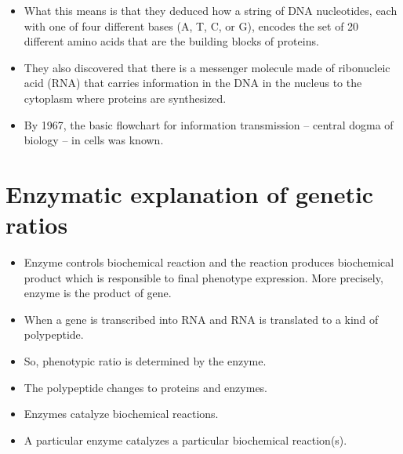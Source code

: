 \documentclass[11pt,dvipsnames,ignorenonframetext,aspectratio=169]{beamer}
\providecommand{\tightlist}{%
  \setlength{\itemsep}{0pt}\setlength{\parskip}{0pt}}
\begin{document}
\begin{frame}{}
\protect\hypertarget{section-11}{}

\begin{itemize}
\tightlist
\item
  What this means is that they deduced how a string of DNA nucleotides,
  each with one of four different bases (A, T, C, or G), encodes the set
  of 20 different amino acids that are the building blocks of proteins.
\item
  They also discovered that there is a messenger molecule made of
  ribonucleic acid (RNA) that carries information in the DNA in the
  nucleus to the cytoplasm where proteins are synthesized.
\item
  By 1967, the basic flowchart for information transmission -- central
  dogma of biology -- in cells was known.
\end{itemize}

\end{frame}

\hypertarget{enzymatic-explanation-of-genetic-ratios}{%
\section{Enzymatic explanation of genetic
ratios}\label{enzymatic-explanation-of-genetic-ratios}}

\begin{frame}{}
\protect\hypertarget{section-12}{}

\begin{itemize}
\tightlist
\item
  Enzyme controls biochemical reaction and the reaction produces
  biochemical product which is responsible to final phenotype
  expression. More precisely, enzyme is the product of gene.
\item
  When a gene is transcribed into RNA and RNA is translated to a kind of
  polypeptide.
\item
  So, phenotypic ratio is determined by the enzyme.
\item
  The polypeptide changes to proteins and enzymes.
\item
  Enzymes catalyze biochemical reactions.
\item
  A particular enzyme catalyzes a particular biochemical reaction(s).
\end{itemize}

\end{frame}
\end{document}
